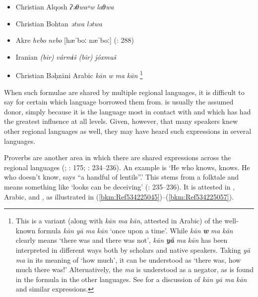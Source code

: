 \documentclass[output=paper]{langsci/langscibook}
\begin{document}
\begin{itemize}[noitemsep]

\item[] Christian Alqosh    \textit{ʔəθwa꞊w} \textit{laθwa} \citep[268]{Coghill2009}

\item[] Christian Bohtan    \textit{ətwa} \textit{lətwa} \citep{Fox2009}

\item[] Akre    \textit{hebo} \textit{nebo} [hæˈboː næˈboː] (\citealt{MacKenzie1962}: 288) 

\item[] Iranian    \textit{(bir)} \textit{vármɨš} \textit{(bir)} \textit{jóxmuš} \citep[175]{Garbell1965}

\item[] {Christian Bəḥzāni Arabic}   \textit{kān} \textit{w} \textit{ma} \textit{kān} \citep[404]{Jastrow1981}\footnote{This is a variant (along with \textit{kān} \textit{ma} \textit{kān}, attested in  Arabic) of the well-known formula \textit{kān} \textit{yā} \textit{ma} \textit{kān} ‘once upon a time’. While \textit{kān} \textbf{\textit{w}} \textit{ma} \textit{kān} clearly means ‘there was and there was not’, \textit{kān} \textbf{\textit{yā}} \textit{ma} \textit{kān} has been interpreted in different ways both by scholars and native speakers. Taking \textit{yā} \textit{ma} in its meaning of ‘how much’, it can be understood as ‘there was, how much there was!’ Alternatively, the \textit{ma} is understood as a negator, as is found in the formula in the other languages. See \citet{Lentin1995} for a discussion of \textit{kān} \textit{yā} \textit{ma} \textit{kān} and similar expressions.}
\end{itemize}

When such formulae are shared by multiple regional languages, it is difficult to say for certain which language  borrowed them from.  is usually the assumed donor, simply because it is the language most in contact with  and which has had the greatest influence at all levels. Given, however, that many speakers knew other regional languages as well, they may have heard such expressions in several languages.

Proverbs are another area in which there are shared expressions across the regional languages (\citealt{Segal1955}; \citealt{Garbell1965}: 175; \citealt{Chyet1995}: 234–236). An example is ‘He who knows, knows. He who doesn’t know, says “a handful of lentils”.’ This stems from a folktale and means something like ‘looks can be deceiving’ (\citealt{Chyet1995}: 235–236). It is attested in ,  Arabic, and , as illustrated in (\ref{bkm:Ref534225045})–(\ref{bkm:Ref534225057}).
\end{document}
